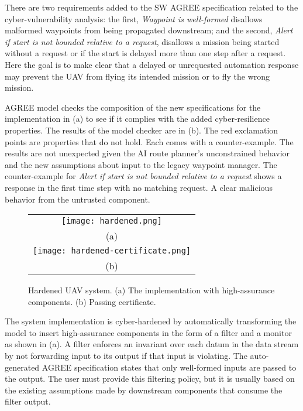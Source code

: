 There are two requirements added to the SW AGREE specification related to the cyber-vulnerability analysis: the first, \emph{Waypoint is well-formed} disallows malformed waypoints from being propagated downstream; and the second, \emph{Alert if start is not bounded relative to a request}, disallows a mission being started without a request or if the start is delayed more than one step after a request. Here the goal is to make clear that a delayed or unrequested automation response may prevent the UAV from flying its intended mission or to fly the wrong mission. 

AGREE model checks the composition of the new specifications for the implementation in (a) to see if it complies with the added cyber-resilience properties. The results of the model checker are in (b). The red exclamation points are properties that do not hold. Each comes with a counter-example. The results are not unexpected given the AI route planner's unconstrained behavior and the new assumptions about input to the legacy waypoint manager. The counter-example for \emph{Alert if start is not bounded relative to a request} shows a response in the first time step with no matching request. A clear malicious behavior from the untrusted component.

\begin{figure*}
  \begin{center}
    \begin{tabular}{c}
      \texttt{[image: hardened.png]} \\
      (a) \\
      \texttt{[image: hardened-certificate.png]} \\
      (b)
    \end{tabular}
  \end{center}
  \caption{Hardened UAV system. (a) The implementation with high-assurance components. (b) Passing certificate.}
  \label{fig:hardened}
\end{figure*}

The system implementation is cyber-hardened by automatically transforming the model to insert high-assurance components in the form of a filter and a monitor as shown in (a). A filter enforces an invariant over each datum in the data stream by not forwarding input to its output if that input is violating. The auto-generated AGREE specification states that only well-formed inputs are passed to the output. The user must provide this filtering policy, but it is usually based on the existing assumptions made by downstream components that consume the filter output. 

